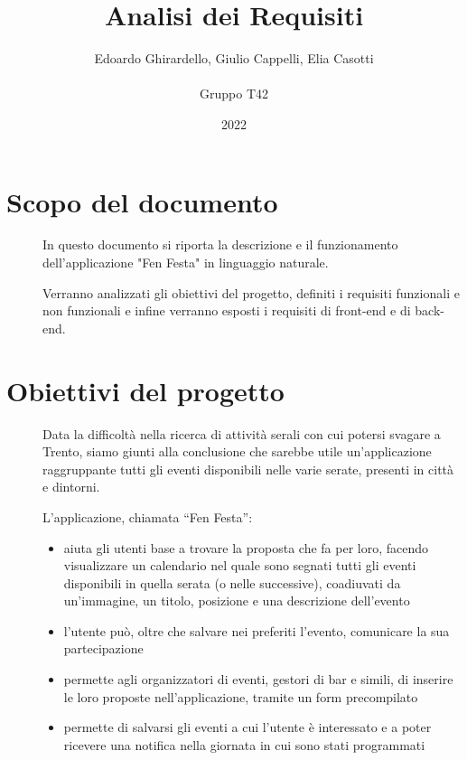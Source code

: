 \documentclass{article}
\title{\textbf{\Huge Analisi dei Requisiti}}
\author{Edoardo Ghirardello, Giulio Cappelli, Elia Casotti \\ \\ Gruppo T42}
\date{2022}
\begin{document}
\maketitle

\clearpage
\tableofcontents
\clearpage

\section{Scopo del documento}
\begin{description}
    \item[] In questo documento si riporta la descrizione e il funzionamento dell'applicazione "Fen Festa" in linguaggio naturale.
    \item[] Verranno analizzati gli obiettivi del progetto, definiti i requisiti funzionali e non funzionali e infine verranno esposti i requisiti di front-end e di back-end.
\end{description}
\clearpage
\section{Obiettivi del progetto}
\begin{description}
    \item[] Data la difficoltà nella ricerca di attività serali con cui potersi svagare a Trento, siamo giunti alla conclusione che sarebbe utile un’applicazione raggruppante tutti gli eventi disponibili nelle varie serate, presenti in città e dintorni.
    \item[] L’applicazione, chiamata “Fen Festa”:
          \begin{itemize}
              \item aiuta gli utenti base a trovare la proposta che fa per loro, facendo visualizzare un calendario nel quale sono segnati tutti gli eventi disponibili in quella serata (o nelle successive), coadiuvati da un’immagine, un titolo, posizione e una descrizione dell’evento
              \item l’utente può, oltre che salvare nei preferiti l’evento, comunicare la sua partecipazione
              \item permette agli organizzatori di eventi, gestori di bar e simili, di inserire le loro proposte nell’applicazione, tramite un form precompilato
              \item permette di salvarsi gli eventi a cui l’utente è interessato e a poter ricevere una notifica nella giornata in cui sono stati programmati
          \end{itemize}
\end{description}
\clearpage
\end{document}
